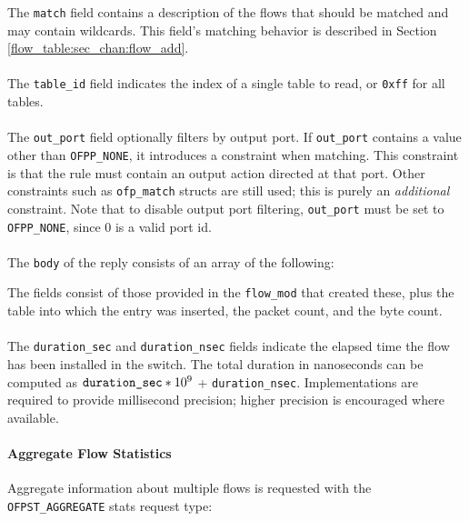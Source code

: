 
The \verb|match| field contains a description of the flows that should be matched and may contain wildcards.  This field's matching behavior is described in Section \ref{flow_table:sec_chan:flow_add}.
\\\\
The \verb|table_id| field indicates the index of a single table to read, or \verb|0xff| for all tables.
\\\\
The \verb|out_port| field optionally filters by output port.  If \verb|out_port| contains a value other than \verb|OFPP_NONE|, it introduces a constraint when matching.  This constraint is that the rule must contain an output action directed at that port.  Other constraints such as \verb|ofp_match| structs are still used; this is purely an \emph{additional} constraint.  Note that to disable output port filtering, \verb|out_port| must be set to \verb|OFPP_NONE|, since 0 is a valid port id. 
\\\\
The \verb|body| of the reply consists of an array of the following:


The fields consist of those provided in the \verb|flow_mod| that created these, plus the table into which the entry was inserted, the packet count, and the byte count.
\\\\
\label{flow_duration_info}The \verb|duration_sec| and \verb|duration_nsec| fields indicate the elapsed time the flow has been installed in the switch. The total duration in nanoseconds can be computed as $\verb|duration_sec|*10^{9}$ + \verb|duration_nsec|. Implementations are required to provide millisecond precision; higher precision is encouraged where available.

\paragraph{Aggregate Flow Statistics}
Aggregate information about multiple flows is requested with the \verb|OFPST_AGGREGATE| stats request type:

